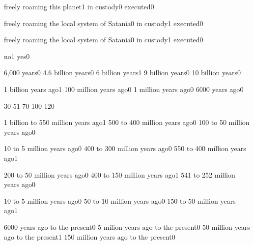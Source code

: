 {freely roaming this planet}{1}
{in custody}{0}
{executed}{0}
\qstop

{freely roaming the local system of Satania}{0}
{in custody}{1}
{executed}{0}
\qstop

{freely roaming the local system of Satania}{0}
{in custody}{1}
{executed}{0}
\qstop




{no}{1}
{yes}{0}
\qstop


{6,000 years}{0}
{4.6 billion years}{0}
{6 billion years}{1}
{9 billion years}{0}
{10 billion years}{0}
\qstop



{1 billion years ago}{1}
{100 million years ago}{0}
{1 million years ago}{0}
{6000 years ago}{0}
\qstop

{3}{0}
{5}{1}
{7}{0}
{10}{0}
{12}{0}
\qstop

{1 billion to 550 million years ago}{1}
{500 to 400 million years ago}{0}
{100 to 50 million years ago}{0}
\qstop

{10 to 5 million years ago}{0}
{400 to 300 million years ago}{0}
{550 to 400 million years ago}{1}
\qstop

{200 to 50 million years ago}{0}
{400 to 150 million years ago}{1}
{541 to 252 million years ago}{0}
\qstop

{10 to 5 million years ago}{0}
{50 to 10 million years ago}{0}
{150 to 50 million years ago}{1}
\qstop

{6000 years ago to the present}{0}
{5 milion years ago to the present}{0}
{50 million years ago to the present}{1}
{150 million years ago to the present}{0}
\qstop

